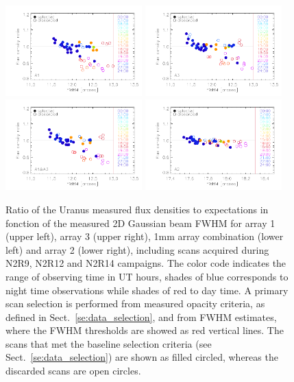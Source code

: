 \begin{figure}[ht!]
\begin{center}
\includegraphics[clip=true,width=0.47\textwidth]{Figures/Calibration/plot_flux_density_ratio_primary_a1.pdf}
\includegraphics[clip=true,width=0.47\textwidth]{Figures/Calibration/plot_flux_density_ratio_primary_a3.pdf}
\includegraphics[clip=true,width=0.47\textwidth]{Figures/Calibration/plot_flux_density_ratio_primary_1mm.pdf}
\includegraphics[clip=true,width=0.47\textwidth]{Figures/Calibration/plot_flux_density_ratio_primary_a2.pdf}
\caption[Uranus flux density stability against FWHM]{Ratio of the
  Uranus measured flux densities to expectations in fonction of the
  measured 2D
  Gaussian beam FWHM for array 1 (upper left), array 3 (upper right),
  1mm array combination (lower left) and array 2 (lower right),
  including scans acquired during N2R9, N2R12 and N2R14 campaigns. The
  color code indicates the range of observing time in UT hours, shades
  of blue corresponds to night time observations while shades of red
  to day time. A primary scan selection is performed from measured
  opacity criteria, as defined in Sect.~\ref{se:data_selection}, and
  from FWHM estimates, where the FWHM thresholds are showed as red vertical
  lines. The scans that met the baseline selection criteria (see
  Sect.~\ref{se:data_selection})
  are shown as filled circled, whereas the discarded scans are open circles.}
\label{fig:uranus_flux_fwhm}
\end{center}
\end{figure}


